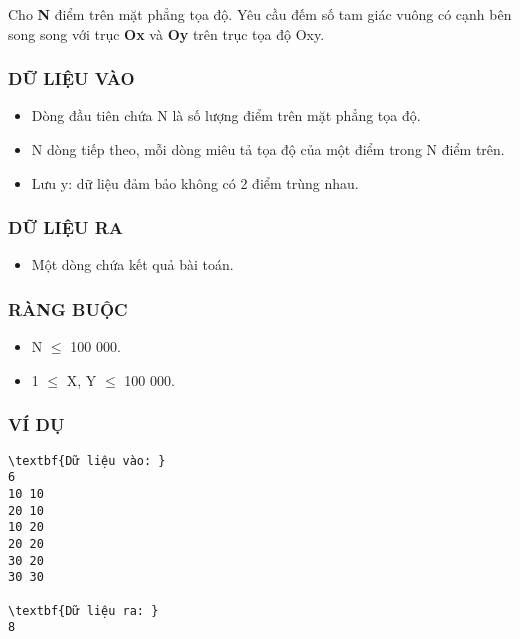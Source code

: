 

Cho \textbf{ N } điểm trên mặt phẳng tọa độ. Yêu cầu đếm số tam giác vuông có cạnh bên song song với trục \textbf{ Ox } và \textbf{ Oy } trên trục tọa độ Oxy.

\subsubsection{DỮ LIỆU VÀO}
\begin{itemize}
	\item Dòng đầu tiên chứa N là số lượng điểm trên mặt phẳng tọa độ.
	\item N dòng tiếp theo, mỗi dòng miêu tả tọa độ của một điểm trong N điểm trên.
	\item Lưu y: dữ liệu đảm bảo không có 2 điểm trùng nhau.
\end{itemize}

\subsubsection{DỮ LIỆU RA}
\begin{itemize}
	\item Một dòng chứa kết quả bài toán.
\end{itemize}

\subsubsection{RÀNG BUỘC}
\begin{itemize}
	\item N  $\le$  100 000.
	\item 1  $\le$  X, Y  $\le$  100 000.
\end{itemize}

\subsubsection{VÍ DỤ}
\begin{verbatim}
\textbf{Dữ liệu vào: }
6
10 10
20 10
10 20
20 20
30 20
30 30

\textbf{Dữ liệu ra: }
8\end{verbatim}
